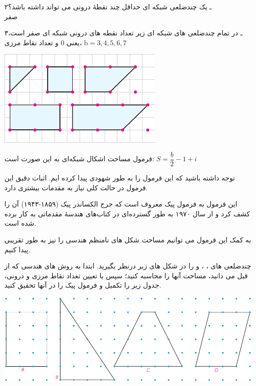 \documentclass[12pt, a4paper]{book}
\begin{document}
\begin{minipage}{0.68\textwidth}
	۲ـ یک چندضلعی شبکه ای حداقل چند نقطهٔ درونی می تواند داشته باشد؟ \\
	 صفر
	
	۳ـ در تمام چندضلعی های شبکه ای زیر تعداد نقطه های درونی شبکه ای صفر است، یعنی
	0
	و تعداد نقاط مرزی، 
	$\mbox{b} = 3 , 4, 5, 6 , 7$
\end{minipage}   
\begin{minipage}{.32\textwidth}
	\begin{flushleft}
		\includegraphics{"Shapes/Fasl - 3/Dars 2/P70-S1.pdf"}
	\end{flushleft}
\end{minipage}

فرمول مساحت اشکال شبکه‌ای به این صورت است: 
$S = \dfrac{b}{2} -1 + i$

توجه داشته باشید که این فرمول را به طور شهودی پیدا کرده ایم. اثبات دقیق این فرمول در حالت کلی نیاز به مقدمات بیشتری دارد.

این فرمول به فرمول پیک معروف است که جرج الکساندر پیک (۱۸۵۹-۱۹۴۳) آن را کشف کرد و از سال ۱۹۷۰ به طور گسترده‌ای در کتاب‌های هندسهٔ مقدماتی به کار برده شده است.

به کمک این فرمول می توانیم مساحت شکل های نامنظم هندسی را نیز به طور تقریبی پیدا کنیم.

چندضلعی های 
 ،
 ،
 و
را در شکل های زیر درنظر بگیرید. ابتدا به روش های هندسی که از قبل می دانید، مساحت آنها را محاسبه کنید؛ سپس با تعیین تعداد نقاط مرزی و درونی، جدول زیر را تکمیل و فرمول پیک را در آنها تحقیق کنید.
\smallskip

\begin{minipage}{1\textwidth}
	\begin{center}
		\includegraphics{"Shapes/Fasl - 3/Dars 2/P71-S1.pdf"}
	\end{center}
\end{minipage}
\end{document}
